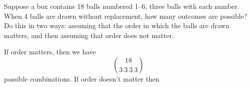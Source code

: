 \documentclass[12pt]{article}
\renewcommand{\qed}{\hfill$\blacksquare$}
\renewenvironment{proof}{\vspace{1em}\begin{addmargin}[2em]{0em}\begin{newproof}}{\end{newproof}\end{addmargin}\qed}
\newenvironment{exercise}[2][Exercise]{\begin{trivlist}
\item[\hskip \labelsep {\bfseries #1} \hskip \labelsep {\bfseries #2.}]}{\end{trivlist}}
\begin{document}
\begin{exercise}{1.5.1 (3pt)}
	Suppose a box contains 18 balls numbered 1–6, three balls with each number. When 4 balls are drawn without replacement, how many outcomes are possible? Do this in two ways: assuming that the order in which the balls are drawn matters, and then assuming that order does not matter.
\end{exercise}
If order matters, then we have
\[
	\binom{18}{3~3~3~3}
\]
possible combinations. If order doesn't matter then
\end{document}
